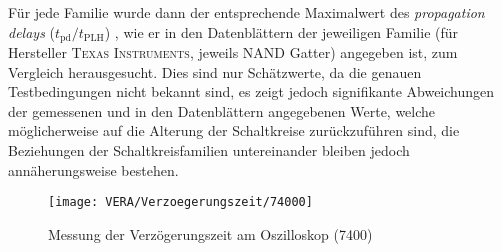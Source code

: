 Für jede Familie wurde dann der entsprechende Maximalwert des \textit{propagation delays}
($t_{\textrm{pd}} / t_\textrm{PLH}$) , wie er in den Datenblättern der
jeweiligen Familie (für Hersteller \textsc{Texas Instruments},
jeweils NAND Gatter) angegeben ist, zum Vergleich herausgesucht. 
Dies sind nur Schätzwerte, da die genauen Testbedingungen nicht bekannt sind, es
zeigt jedoch signifikante Abweichungen der gemessenen und in den Datenblättern
angegebenen Werte, welche möglicherweise auf die Alterung der Schaltkreise
zurückzuführen sind, die Beziehungen der Schaltkreisfamilien untereinander bleiben
jedoch annäherungsweise bestehen.

  \begin{figure}[h]
  \begin{center}
    \texttt{[image: VERA/Verzoegerungszeit/74000]}
  \end{center}
  \caption{Messung der Verzögerungszeit am Oszilloskop (7400)}
  \label{fig:graphic_low}
\end{figure}
